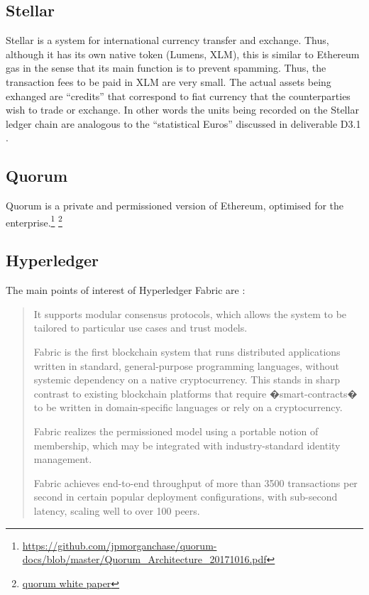 \subsection{Stellar}
Stellar is a system for international currency transfer and exchange. Thus, although it has its own native token (Lumens, XLM), this is similar to Ethereum gas in the sense that its main function is to prevent spamming. Thus, the transaction fees to be paid in XLM are very small. The actual assets being exhanged are ``credits'' that correspond to fiat currency that the counterparties wish to trade or exchange. In other words the units being recorded on the Stellar ledger chain are analogous to the ``statistical Euros'' discussed in  deliverable D3.1 \cite{INTERLACE_D31}.



\subsection{Quorum}
Quorum is a private and permissioned version of Ethereum, optimised for the enterprise.\footnote{\url{https://github.com/jpmorganchase/quorum-docs/blob/master/Quorum_Architecture_20171016.pdf}} \footnote{\url{quorum white paper}}




\subsection{Hyperledger}
The main points of interest of Hyperledger Fabric are \cite{AndroulakiEtAl2018}:


\begin{quote}
\begin{packed_item1}
\item It supports modular consensus protocols, which allows the system to be tailored to particular use cases and trust models.
\item Fabric is the first blockchain system that runs distributed applications written in standard, general-purpose programming languages, without systemic dependency on a native cryptocurrency. This stands in sharp contrast to existing blockchain platforms that require �smart-contracts� to be written in domain-specific languages or rely on a cryptocurrency.
\item Fabric realizes the permissioned model using a portable notion of membership, which may be integrated with industry-standard identity management.
\item Fabric achieves end-to-end throughput of more than 3500 transactions per second in certain popular deployment configurations, with sub-second latency, scaling well to over 100 peers.
\end{packed_item1}
\end{quote}



